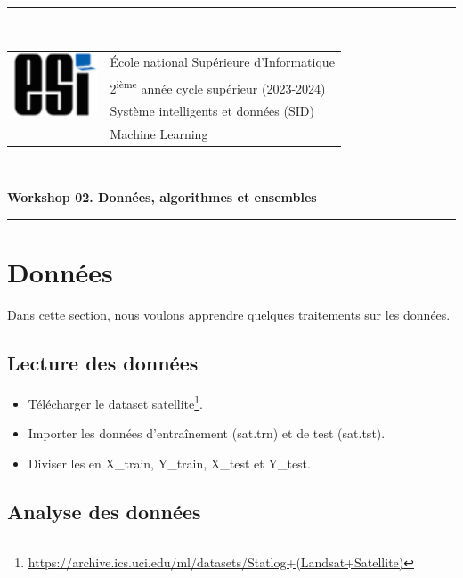 \documentclass[12pt, a4paper]{article}
\begin{document}

\noindent\rule{\textwidth}{1pt}\\[0.25cm]
\noindent
\begin{tabular}{ll}
\multirow{3}{*}{\includegraphics[width=2.5cm]{../extra/logo/esi-logo.png}} & \'Ecole national Supérieure d'Informatique\\
& 2\textsuperscript{ième} année cycle supérieur (2023-2024)\\
& Système intelligents et données (SID)\\
& Machine Learning\\
\end{tabular}\\[.25cm]
\noindent
\begin{center}
{\LARGE\bfseries Workshop 02. Données, algorithmes et ensembles}\\
\end{center}
\noindent\rule{\textwidth}{1pt}


\section{Données}

Dans cette section, nous voulons apprendre quelques traitements sur les données.

\subsection{Lecture des données}

\begin{itemize}
	\item Télécharger le dataset satellite\footnote{\url{https://archive.ics.uci.edu/ml/datasets/Statlog+(Landsat+Satellite)}}.
	\item Importer les données d'entraînement (sat.trn) et de test (sat.tst).
	\item Diviser les en X\_train, Y\_train, X\_test et Y\_test.
\end{itemize}

\subsection{Analyse des données}
\end{document}
